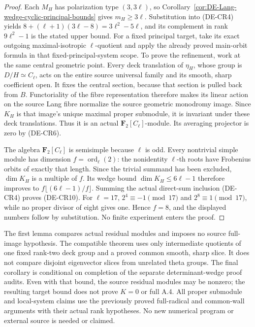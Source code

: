 \begin{proof}
Each \(M_H\) has polarization type \((3,3\ell)\), so
Corollary~\ref{cor:DE-Lang-wedge-cyclic-principal-bounds} gives
\(m_H\ge3\ell\). Substitution into (DE-CR4) yields
\(8+(\ell+1)(3\ell-8)=3\ell^2-5\ell\), and its
complement in rank \(9\ell^2-1\) is the stated upper bound.
For a fixed principal target, take its exact outgoing
maximal-isotropic \(\ell\)-quotient and apply the already
proved main-orbit formula in that fixed-principal-system scope.
To prove the refinement, work at the same central geometric
point. Every deck translation of \(\eta_H\), whose group is
\(D/H\simeq C_\ell\), acts on the entire source universal
family and its smooth, sharp coefficient open. It fixes the
central section, because that section is pulled back from \(B\).
Functoriality of the fibre representation therefore makes its
linear action on the source Lang fibre normalize the source
geometric monodromy image. Since \(K_H\) is that image's unique
maximal proper submodule, it is invariant under these deck
translations. Thus it is an actual \(\mathbf F_2[C_\ell]\)-module.
Its averaging projector is zero by (DE-CR6).

The algebra \(\mathbf F_2[C_\ell]\) is semisimple because
\(\ell\) is odd. Every nontrivial simple module has dimension
\(f=\operatorname{ord}_\ell(2)\): the nonidentity \(\ell\)-th
roots have Frobenius orbits of exactly that length. Since the
trivial summand has been excluded, \(\dim K_H\) is a multiple
of \(f\). Its wedge bound \(\dim K_H\le6\ell-1\) therefore
improves to \(f\lfloor(6\ell-1)/f\rfloor\). Summing the
actual direct-sum inclusion (DE-CR4) proves (DE-CR10).
For \(\ell=17\), \(2^4\equiv-1\pmod {17}\) and
\(2^8\equiv1\pmod {17}\), while no proper divisor of eight
gives one. Hence \(f=8\), and the displayed numbers follow
by substitution. No finite experiment enters the proof.
\end{proof}

\begin{remark}
\label{rem:DE-compatible-residual-module-scope}
The first lemma compares actual residual modules and imposes no
source full-image hypothesis. The compatible theorem uses only
intermediate quotients of one fixed rank-two deck group and a
proved common smooth, sharp slice. It does not compare disjoint
eigenvector slices from unrelated theta groups.
The final corollary is conditional on completion of the separate
determinant-wedge proof audits. Even with that bound, the source
residual modules may be nonzero; the resulting target bound does
not prove \(K=0\) or full A.4. All proper submodule and local-system
claims use the previously proved full-radical and common-wall
arguments with their actual rank hypotheses. No new numerical
program or external source is needed or claimed.
\end{remark}
